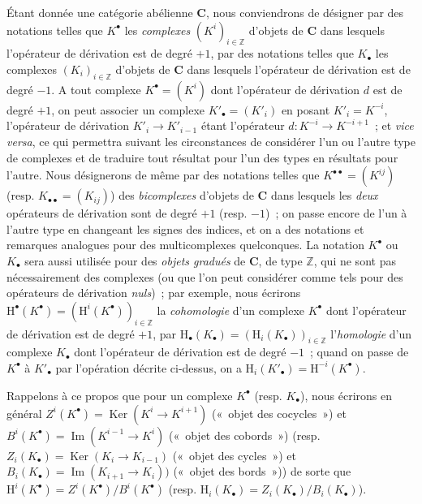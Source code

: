 \begin{env}[11.2.1]
\label{0.11.2.1-fr}
Étant donnée une catégorie abélienne $\boldsymbol{C}$, nous conviendrons de
désigner par des notations telles que $K^\bullet$ les \emph{complexes}
$(K^i)_{i\in\mathbb Z}$ d'objets de $\boldsymbol{C}$ dans lesquels l'opérateur de
dérivation est de degré $+1$, par des notations telles que $K_\bullet$ les
complexes $(K_i)_{i\in\mathbb Z}$ d'objets de $\boldsymbol{C}$ dans lesquels
l'opérateur de dérivation est de degré $-1$. A tout complexe
$K^\bullet=(K^i)$ dont l'opérateur de dérivation $d$ est de degré $+1$, on
peut associer un complexe $K'_\bullet=(K'_i)$ en posant $K'_i=K^{-i}$,
l'opérateur de dérivation $K'_i\to K'_{i-1}$ étant l'opérateur
$d:K^{-i}\to K^{-i+1}$~; et \emph{vice versa}, ce qui permettra suivant les
circonstances de considérer l'un ou l'autre type de complexes et de traduire
tout résultat pour l'un des types en résultats pour l'autre. Nous désignerons
de même par des notations telles que $K^{\bullet\bullet}=(K^{ij})$ (resp.
$K_{\bullet\bullet}=(K_{ij})$) des \emph{bicomplexes} d'objets de
$\boldsymbol{C}$ dans lesquels les \emph{deux} opérateurs de dérivation sont de
degré $+1$ (resp. $-1$)~; on passe encore de l'un à l'autre type en changeant
les signes des indices, et on a des notations et remarques analogues pour des
multicomplexes quelconques. La notation $K^\bullet$ ou $K_\bullet$ sera aussi
utilisée pour des \emph{objets gradués} de $\boldsymbol{C}$, de type $\mathbb Z$,
qui ne sont pas nécessairement des complexes (ou que l'on peut considérer
comme tels pour des opérateurs de dérivation \emph{nuls})~; par exemple, nous
écrirons
$\mathrm H^\bullet(K^\bullet)=(\mathrm H^i(K^\bullet))_{i\in\mathbb Z}$ la
\emph{cohomologie} d'un complexe $K^\bullet$ dont l'opérateur de dérivation
est de degré $+1$, par
$\mathrm H_\bullet(K_\bullet)=(\mathrm H_i(K_\bullet))_{i\in\mathbb Z}$
l'\emph{homologie} d'un complexe $K_\bullet$ dont l'opérateur de dérivation
est de degré $-1$~; quand on passe de $K^\bullet$ à $K'_\bullet$ par
l'opération décrite ci-dessus, on a
$\mathrm H_i(K'_\bullet)=\mathrm H^{-i}(K^\bullet)$.

Rappelons à ce propos que pour un complexe $K^\bullet$ (resp. $K_\bullet$),
nous écrirons en général
$Z^i(K^\bullet)=\operatorname{Ker}(K^i\to K^{i+1})$ («~objet des cocycles~»)
et $B^i(K^\bullet)=\operatorname{Im}(K^{i-1}\to K^i)$ («~objet des
cobords~») (resp.
$Z_i(K_\bullet)=\operatorname{Ker}(K_i\to K_{i-1})$ («~objet des cycles~»)
et $B_i(K_\bullet)=\operatorname{Im}(K_{i+1}\to K_i))$ («~objet des
bords~»)) de sorte que
$\mathrm H^i(K^\bullet)=Z^i(K^\bullet)/B^i(K^\bullet)$ (resp.
$\mathrm H_i(K_\bullet)=Z_i(K_\bullet)/B_i(K_\bullet)$).


\end{env}
